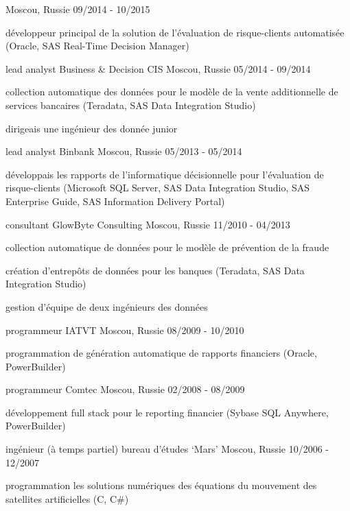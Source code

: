 \begin{cventries}
    {Moscou, Russie}
    {09/2014 - 10/2015}
    {
      \begin{cvitems}
        \item {développeur principal de la solution de l'évaluation de risque-clients automatisée (Oracle, SAS Real-Time Decision Manager)}
      \end{cvitems}
    }
  \cventry
    {lead analyst}
    {Business \& Decision CIS}
    {Moscou, Russie}
    {05/2014 - 09/2014}
    {
      \begin{cvitems}
        \item {collection automatique des données pour le modèle de la vente additionnelle de services bancaires (Teradata, SAS Data Integration Studio)}
        \item {dirigeais une ingénieur des donnée junior}
      \end{cvitems}
    }
  \cventry
    {lead analyst}
    {Binbank}
    {Moscou, Russie}
    {05/2013 - 05/2014}
    {
      \begin{cvitems}
        \item {développais les rapports de l'informatique décisionnelle pour l'évaluation de risque-clients (Microsoft SQL Server, SAS Data Integration Studio, SAS Enterprise Guide, SAS Information Delivery Portal)}
      \end{cvitems}
    }
  \cventry
    {consultant}
    {GlowByte Consulting}
    {Moscou, Russie}
    {11/2010 - 04/2013}
    {
      \begin{cvitems}
        \item {collection automatique de données pour le modèle de prévention de la fraude}
        \item {création d'entrepôts de données pour les banques (Teradata, SAS Data Integration Studio)}
        \item {gestion d'équipe de deux ingénieurs des données}
      \end{cvitems}
    }
  \cventry
    {programmeur}
    {IATVT}
    {Moscou, Russie}
    {08/2009 - 10/2010}
    {
      \begin{cvitems}
        \item {programmation de génération automatique de rapports financiers (Oracle, PowerBuilder)}
      \end{cvitems}
    }
  \cventry
    {programmeur}
    {Comtec}
    {Moscou, Russie}
    {02/2008 - 08/2009}
    {
      \begin{cvitems}
        \item {développement full stack pour le reporting financier (Sybase SQL Anywhere, PowerBuilder)}
      \end{cvitems}
    }
  \cventry
    {ingénieur (à temps partiel)}
    {bureau d'études `Mars'}
    {Moscou, Russie}
    {10/2006 - 12/2007}
    {
      \begin{cvitems}
        \item {programmation les solutions numériques des équations du mouvement des satellites artificielles (C, C\#)}
      \end{cvitems}
    }
\end{cventries}
